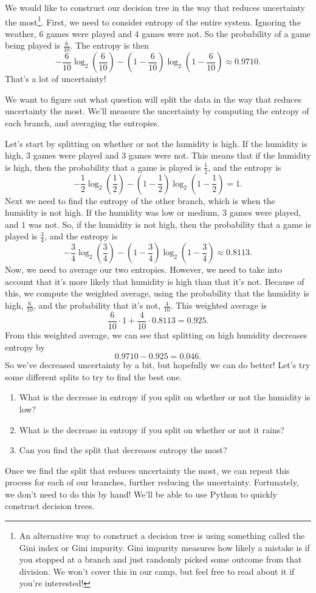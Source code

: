 \documentclass[10pt]{article}
\begin{document}
We would like to construct our decision tree in the way that reduces uncertainty the most\footnote{An alternative way to construct a decision tree is using something called the Gini index or Gini impurity. Gini impurity measures how likely a mistake is if you stopped at a branch and just randomly picked some outcome from that division. We won't cover this in our camp, but feel free to read about it if you're interested!}. First, we need to consider entropy of the entire system. Ignoring the weather, 6 games were played and 4 games were not. So the probability of a game being played is $\frac{6}{10}$. The entropy is then
\[
-\frac{6}{10}\log_2\left(\frac{6}{10}\right) - \left(1-\frac{6}{10}\right)\log_2\left(1-\frac{6}{10}\right)\approx 0.9710.
\]
That's a lot of uncertainty!

We want to figure out what question will split the data in the way that reduces uncertainty the most. We'll measure the uncertainty by computing the entropy of each branch, and averaging the entropies.

Let's start by splitting on whether or not the humidity is high. If the humidity is high, 3 games were played and 3 games were not. This means that if the humidity is high, then the probability that a game is played is $\frac{1}{2}$, and the entropy is
\[
-\frac{1}{2}\log_2\left(\frac{1}{2}\right) - \left(1-\frac{1}{2}\right)\log_2\left(1-\frac{1}{2}\right)=1.
\]
Next we need to find the entropy of the other branch, which is when the humidity is not high. If the humidity was low or medium, $3$ games were played, and $1$ was not. So, if the humidity is not high, then the probability that a game is played is $\frac{3}{4}$, and the entropy is
\[
-\frac{3}{4}\log_2\left(\frac{3}{4}\right) - \left(1-\frac{3}{4}\right)\log_2\left(1-\frac{3}{4}\right)\approx 0.8113.
\]
Now, we need to average our two entropies. However, we need to take into account that it's more likely that humidity is high than that it's not. Because of this, we compute the weighted average, using the probability that the humidity is high, $\frac{6}{10}$, and the probability that it's not, $\frac{4}{10}$. This weighted average is
\[
\frac{6}{10}\cdot 1 + \frac{4}{10}\cdot 0.8113 = 0.925.
\]
From this weighted average, we can see that splitting on high humidity decreases entropy by
\[
0.9710 - 0.925 = 0.046.
\]
So we've decreased uncertainty by a bit, but hopefully we can do better! Let's try some different splits to try to find the best one.

\begin{enumerate}
\item What is the decrease in entropy if you split on whether or not the humidity is low?
\vfill

\newpage
\item What is the decrease in entropy if you split on whether or not it rains?
\vfill

\item Can you find the split that decreases entropy the most?
\vfill
\end{enumerate}

Once we find the split that reduces uncertainty the most, we can repeat this process for each of our branches, further reducing the uncertainty. Fortunately, we don't need to do this by hand! We'll be able to use Python to quickly construct decision trees.
\end{document}
